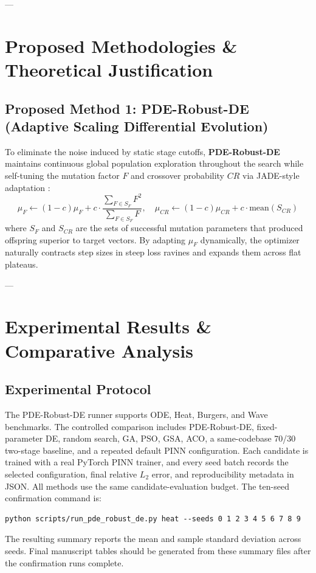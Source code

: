 \documentclass[authoryear,preprint,12pt]{elsarticle}
\begin{document}
---

\section{Proposed Methodologies \& Theoretical Justification}
\label{sec:methodology}

\subsection{Proposed Method 1: PDE-Robust-DE (Adaptive Scaling Differential Evolution)}
To eliminate the noise induced by static stage cutoffs, \textbf{PDE-Robust-DE} maintains continuous global population exploration throughout the search while self-tuning the mutation factor $F$ and crossover probability $CR$ via JADE-style adaptation \citep{zhang2009jade}:
\begin{equation}
\mu_F \leftarrow (1-c)\mu_F + c \cdot \frac{\sum_{F \in S_F} F^2}{\sum_{F \in S_F} F}, \quad \mu_{CR} \leftarrow (1-c)\mu_{CR} + c \cdot \text{mean}(S_{CR})
\end{equation}
where $S_F$ and $S_{CR}$ are the sets of successful mutation parameters that produced offspring superior to target vectors. By adapting $\mu_F$ dynamically, the optimizer naturally contracts step sizes in steep loss ravines and expands them across flat plateaus.

---

\section{Experimental Results \& Comparative Analysis}
\label{sec:results}

\subsection{Experimental Protocol}
The PDE-Robust-DE runner supports ODE, Heat, Burgers, and Wave benchmarks. The controlled comparison includes PDE-Robust-DE, fixed-parameter DE, random search, GA, PSO, GSA, ACO, a same-codebase 70/30 two-stage baseline, and a repeated default PINN configuration. Each candidate is trained with a real PyTorch PINN trainer, and every seed batch records the selected configuration, final relative $L_2$ error, and reproducibility metadata in JSON. All methods use the same candidate-evaluation budget. The ten-seed confirmation command is:
\begin{verbatim}
python scripts/run_pde_robust_de.py heat --seeds 0 1 2 3 4 5 6 7 8 9
\end{verbatim}
The resulting summary reports the mean and sample standard deviation across seeds. Final manuscript tables should be generated from these summary files after the confirmation runs complete.
\end{document}
